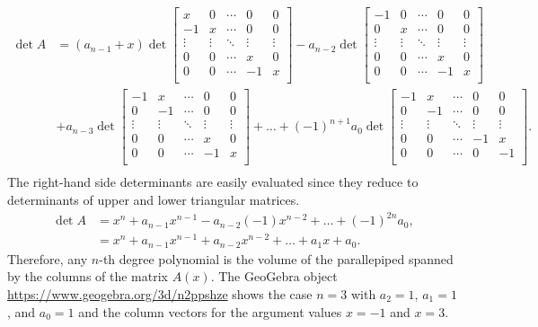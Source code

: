 \documentclass[10pt]{article}
\begin{document}
{\tiny
\begin{align*}
\det A &= (a_{n-1} + x) \det\left[\begin{array}{ccccc}
x  & 0 & \cdots & 0 & 0 \\
-1 & x & \cdots & 0 & 0 \\
\vdots & \vdots & \ddots & \vdots & \vdots \\
0  & 0 & \cdots & x & 0 \\
0  & 0 & \cdots & -1 & x \\
\end{array}\right]
 -a_{n-2} \det\left[\begin{array}{ccccc}
-1 & 0 & \cdots & 0 & 0 \\
0  & x & \cdots & 0 & 0 \\
\vdots & \vdots & \ddots & \vdots & \vdots \\
0  & 0 & \cdots & x & 0 \\
0  & 0 & \cdots & -1 & x \\
\end{array}\right]\\
 &+a_{n-3} \det\left[\begin{array}{ccccc}
-1 & x & \cdots & 0 & 0 \\
0 & -1 & \cdots & 0 & 0 \\
\vdots & \vdots & \ddots & \vdots & \vdots \\
0  & 0 & \cdots & x & 0 \\
0  & 0 & \cdots & -1 & x \\
\end{array}\right] + \ldots + (-1)^{n+1} a_0 \det\left[\begin{array}{ccccc}
-1 & x & \cdots & 0 & 0 \\
0 & -1 & \cdots & 0 & 0 \\
\vdots & \vdots & \ddots & \vdots & \vdots \\
0  & 0 & \cdots & -1 & x \\
0  & 0 & \cdots & 0  & -1 \\
\end{array}\right].\\
\end{align*}
}
The right-hand side determinants are easily evaluated since they
reduce to determinants of upper and lower triangular matrices.
\begin{align*}
\det A &= x^n + a_{n-1} x^{n-1} - a_{n-2} (-1) x^{n-2} + \ldots + (-1)^{2n} a_0,\\
 &= x^n + a_{n-1} x^{n-1} + a_{n-2} x^{n-2} + \ldots + a_1 x + a_0.
\end{align*}
Therefore, any $n$-th degree polynomial is the volume of the parallepiped
spanned by the columns of the matrix $A(x)$. The GeoGebra object \url{https://www.geogebra.org/3d/n2ppshze} shows the case $n=3$ with $a_2=1$, $a_1=1$, and $a_0=1$ and the column vectors for the argument values $x=-1$ and $x=3$.
\end{document}
